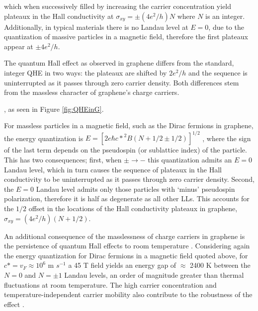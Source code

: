 \documentclass[edeposit,fullpage,draftthesis]{uiucthesis2009}
\begin{document}
    which when successively filled by 
    increasing the carrier concentration yield plateaux in the Hall conductivity at 
    $\sigma_{xy} = \pm (4e^2/h) N$ where $N$ is an integer. Additionally, in typical materials 
    there is no Landau level at $E=0$, due to the 
    quantization of massive particles in a magnetic field, therefore the first plateaux 
    appear at $\pm 4 e^2/h$. 
    
    The quantum Hall effect as observed in graphene differs from the 
    standard, integer QHE in two ways: the plateaux are shifted by $2 e^2/h$ and the sequence 
    is uninterrupted as it passes through zero carrier density. Both differences stem from 
    the massless character of graphene's charge carriers.

    , as seen in Figure \ref{fig:QHEinG}. 
    
    For massless particles in a magnetic field, such as the Dirac fermions in graphene, the energy quantization is $E = [ 2 e \hbar {c\ast}^2 B (N + 1/2 \pm 1/2) ]^{1/2}$ \cite{Novoselov2005}, where the sign of the last term depends on the pseudospin (or sublattice index) of the particle. This has two consequences; first, when $\pm \rightarrow -$ this quantization admits an $E=0$ Landau level, which in turn causes the sequence of plateaux in the Hall conductivity to be uninterrupted as it passes through zero carrier density. Second, the $E=0$ Landau level admits only those particles with `minus' pseudospin polarization, therefore it is half as degenerate as all other LLs. This accounts for the $1/2$ offset in the locations of the Hall conductivity plateaux in graphene, $\sigma_{xy} = (4 e^2/h )(N + 1/2)$.

    An additional consequence of the masslessness of charge carriers in graphene is the persistence of quantum Hall effects to room temperature \cite{Novoselov2007}. Considering again the energy quantization for Dirac fermions in a magnetic field quoted above, for $c\ast = v_F \approx 10^6$ m $s^{-1}$ a 45 T field yields an energy gap of $\approx$ 2400 K between the $N=0$ and $N=\pm1$ Landau levels, an order of magnitude greater than thermal fluctuations at room temperature. The high carrier concentration and temperature-independent carrier mobility also contribute to the robustness of the effect \cite{Novoselov2007}.
\end{document}

